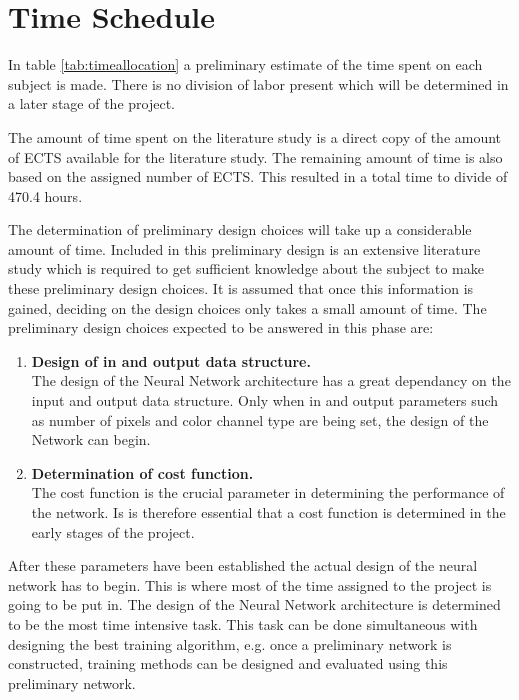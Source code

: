 \section{Time Schedule}
\label{TimeTable}

In table \ref{tab:timeallocation} a preliminary estimate of the time spent on each subject is made. There is no division of labor present which will be determined in a later stage of the project.

The amount of time spent on the literature study is a direct copy of the amount of ECTS available for the literature study. The remaining amount of time is also based on the assigned number of ECTS. This resulted in a total time to divide of 470.4 hours.

The determination of preliminary design choices will take up a considerable amount of time. Included in this preliminary design is an extensive literature study which is required to get sufficient knowledge about the subject to make these preliminary design choices. It is assumed that once this information is gained, deciding on the design choices only takes a small amount of time. The preliminary design choices expected to be answered in this phase are: 

\begin{enumerate}
	\item \textbf{Design of in and output data structure.} \\ The design of the Neural Network architecture has a great dependancy on the input and output data structure. Only when in and output parameters such as number of pixels and color channel type are being set, the design of the Network can begin.
	\item \textbf{Determination of cost function.} \\ The cost function is the crucial parameter in determining the performance of the network. Is is therefore essential that a cost function is determined in the early stages of the project.	
\end{enumerate}

After these parameters have been established the actual design of the neural network has to begin. This is where most of the time assigned to the project is going to be put in. The design of the Neural Network architecture is determined to be the most time intensive task. This task can be done simultaneous with designing the best training algorithm, e.g. once a preliminary network is constructed, training methods can be designed and evaluated using this preliminary network.


